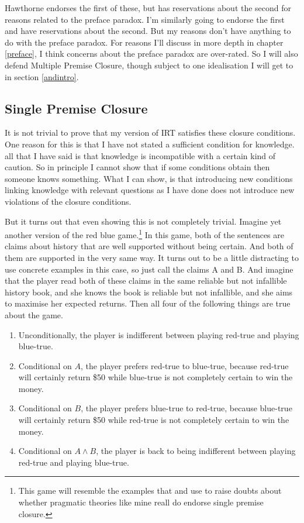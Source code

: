 \documentclass[11pt,]{book}
\providecommand{\tightlist}{%
  \setlength{\itemsep}{0pt}\setlength{\parskip}{0pt}}
\let\rmarkdownfootnote\footnote%
\def\footnote{\protect\rmarkdownfootnote}
\begin{document}
Hawthorne endorses the first of these, but has reservations about the second for reasons related to the preface paradox. I'm similarly going to endorse the first and have reservations about the second. But my reasons don't have anything to do with the preface paradox. For reasons I'll discuss in more depth in chapter \ref{preface}, I think concerns about the preface paradox are over-rated. So I will also defend Multiple Premise Closure, though subject to one idealisation I will get to in section \ref{andintro}.

\hypertarget{andelim}{%
\subsection{Single Premise Closure}\label{andelim}}

It is not trivial to prove that my version of IRT satisfies these closure conditions. One reason for this is that I have not stated a sufficient condition for knowledge. all that I have said is that knowledge is incompatible with a certain kind of caution. So in principle I cannot show that if some conditions obtain then someone knows something. What I can show, is that introducing new conditions linking knowledge with relevant questions as I have done does not introduce new violations of the closure conditions.

But it turns out that even showing this is not completely trivial. Imagine yet another version of the red blue game.\footnote{This game will resemble the examples that \citet{Zweber2016} and \citet{AndersonHawthorne2019b} use to raise doubts about whether pragmatic theories like mine reall do endorse single premise closure.} In this game, both of the sentences are claims about history that are well supported without being certain. And both of them are supported in the very same way. It turns out to be a little distracting to use concrete examples in this case, so just call the claims A and B. And imagine that the player read both of these claims in the same reliable but not infallible history book, and she knows the book is reliable but not infallible, and she aims to maximise her expected returns. Then all four of the following things are true about the game.

\begin{enumerate}
\def\labelenumi{\arabic{enumi}.}
\tightlist
\item
  Unconditionally, the player is indifferent between playing red-true and playing blue-true.
\item
  Conditional on \(A\), the player prefers red-true to blue-true, because red-true will certainly return \$50 while blue-true is not completely certain to win the money.
\item
  Conditional on \(B\), the player prefers blue-true to red-true, because blue-true will certainly return \$50 while red-true is not completely certain to win the money.
\item
  Conditional on \(A \wedge B\), the player is back to being indifferent between playing red-true and playing blue-true.
\end{enumerate}
\end{document}
